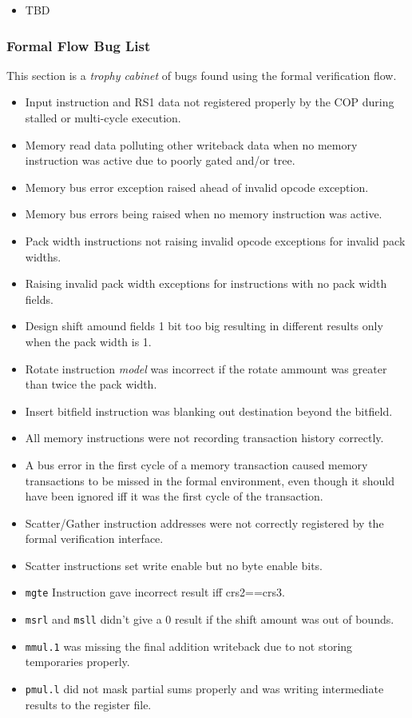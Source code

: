 \begin{itemize}
\item TBD
\end{itemize}

\subsubsection{Formal Flow Bug List}

This section is a {\em trophy cabinet} of bugs found using the formal
verification flow.

\begin{itemize}
\item Input instruction and RS1 data not registered properly by the COP during
    stalled or multi-cycle execution.
\item Memory read data polluting other writeback data when no memory
    instruction was active due to poorly gated and/or tree.
\item Memory bus error exception raised ahead of invalid opcode exception.
\item Memory bus errors being raised when no memory instruction was active.
\item Pack width instructions not raising invalid opcode exceptions for
    invalid pack widths.
\item Raising invalid pack width exceptions for instructions with no pack width
    fields.
\item Design shift amound fields 1 bit too big resulting in different results
    only when the pack width is 1.
\item Rotate instruction {\em model} was incorrect if the rotate ammount was
    greater than twice the pack width.
\item Insert bitfield instruction was blanking out destination beyond the
    bitfield.
\item All memory instructions were not recording transaction history correctly.
\item A bus error in the first cycle of a memory transaction caused memory
    transactions to be missed in the formal environment, even though it
    should have been ignored iff it was the first cycle of the transaction.
\item Scatter/Gather instruction addresses were not correctly registered
    by the formal verification interface.
\item Scatter instructions set write enable but no byte enable bits.
\item {\tt mgte} Instruction gave incorrect result iff crs2==crs3.
\item {\tt msrl} and {\tt msll} didn't give a 0 result if the shift
    amount was out of bounds.
\item {\tt mmul.1} was missing the final addition writeback due to not
    storing temporaries properly.
\item {\tt pmul.l} did not mask partial sums properly and was writing
    intermediate results to the register file.
\end{itemize}
